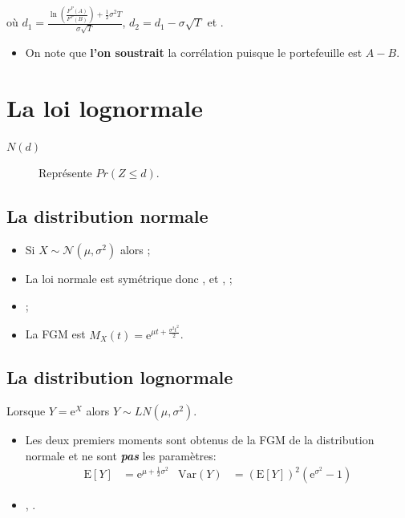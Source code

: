 \documentclass[10pt, french]{article}
\begin{document}
\begin{multicols*}{2}
où $d_{1}	=	\frac{\ln\left(\frac{F^{P}(A)}{F^{P}(B)}\right) + \frac{1}{2} \sigma^{2} T}{\sigma \sqrt{T}}$, $d_{2}	=	d_{1} - \sigma \sqrt{T}$ et .
\begin{itemize}
	\item	On note que \textbf{l'on soustrait} la corrélation puisque le portefeuille est $A	-	B$.
\end{itemize}

\pagebreak
\setcounter{section}{17}
\section{La loi lognormale}
\label{sec:lognorm}
\begin{distributions}[Notation]
\begin{description}
	\item[$N(d)$]	Représente $Pr(Z \leq d)$.
\end{description}
\end{distributions}


\subsection{La distribution normale}
\begin{itemize}[leftmargin = *]
	\item	Si $X \sim \mathcal{N}(\mu, \sigma^{2})$ alors ;
	\item	La loi normale est symétrique donc ,  et , ;
	\item	{};
	\item	La FGM est $M_{X}(t)	=	\textrm{e}^{\mu t + \frac{\sigma^{2} t^{2}}{2}}$.
\end{itemize}


\subsection{La distribution lognormale}
Lorsque $Y = \textrm{e}^{X}$ alors $Y \sim LN(\mu,\sigma^{2})$.

\begin{itemize}
	\item	Les deux premiers moments sont obtenus de la FGM de la distribution normale et ne sont \textbf{\textit{pas}} les paramètres:
		\begin{align*}
		\text{E}[Y]
		&=	\textrm{e}^{\mu + \frac{1}{2}\sigma^{2}}	&
		\text{Var}(Y)
		&=	\left(\text{E}[Y]\right)^{2} \left(\textrm{e}^{\sigma^{2}} - 1\right)	
		\end{align*}
	\item	{}, .
\end{itemize}


\end{multicols*}
\end{document}
